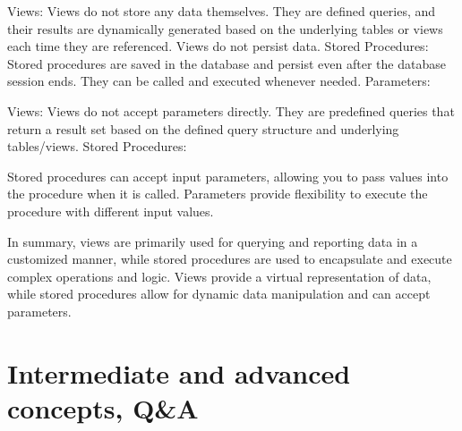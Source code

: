 Views: Views do not store any data themselves. They are defined queries, and their results are dynamically generated based on the underlying tables or views each time they are referenced. Views do not persist data.
Stored Procedures: Stored procedures are saved in the database and persist even after the database session ends. They can be called and executed whenever needed.
Parameters:

Views: Views do not accept parameters directly. They are predefined queries that return a result set based on the defined query structure and underlying tables/views.
Stored Procedures: 

Stored procedures can accept input parameters, allowing you to pass values into the procedure when it is called. Parameters provide flexibility to execute the procedure with different input values.

In summary, views are primarily used for querying and reporting data in a customized manner, while stored procedures are used to encapsulate and execute complex operations and logic. Views provide a virtual representation of data, while stored procedures allow for dynamic data manipulation and can accept parameters.

\section{Intermediate and advanced concepts, Q\&A}


